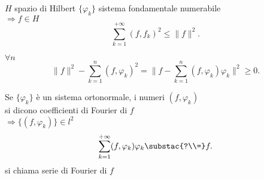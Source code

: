 \documentclass[12px]{article}
\begin{document}
	\begin{coro}
		$H$ spazio di Hilbert $\{ \varphi_k\}$ sistema fondamentale numerabile \\
		$ \Rightarrow f\in H$ \\
		\[
		\sum^{+\infty}_{k = 1} (f,f_k)^2 \leq \|f\|^2
		.\] 
	\end{coro}
	\begin{dimo}
		$\forall n$ 
		 \[
		\|f\|^2- \sum^{n}_{k = 1}(f, \varphi_k)^2 = \|f- \sum^{n}_{k=1}(f, \varphi_k) \varphi_k\|^2\geq 0
		.\] 
	\end{dimo}
	\begin{defi}
		Se $\{ \varphi_k\}$ è un sistema ortonormale, i numeri $(f, \varphi_k)$\\
		si dicono coefficienti di Fourier di $f$\\
		$ \Rightarrow  \{(f, \varphi_k)\}\in l^2$ \\
		\[
			\sum^{+\infty}_{k =1}(f, \varphi_k) \varphi_k \substac{?\\=} f
		.\] 
		si chiama serie di Fourier di $f$
	\end{defi}
\end{document}
